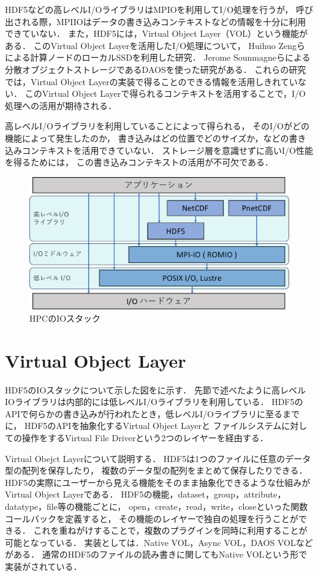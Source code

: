 \documentclass[submit,techrep,noauthor]{ipsj}
\begin{document}
HDF5などの高レベルI/OライブラリはMPIOを利用してI/O処理を行うが，
呼び出される際，MPIIOはデータの書き込みコンテキストなどの情報を十分に利用できていない．
また，HDF5には，Virtual Object Layer（VOL）という機能がある．
このVirtual Object Layerを活用したI/O処理について，
Huihuo Zengらによる計算ノードのローカルSSDを利用した研究\cite{zheng2022hdf5}．
Jerome Sounmagneらによる分散オブジェクトストレージであるDAOSを使った研究がある\cite{soumagne2021accelerating}．
これらの研究では，Virtual Object Layerの実装で得ることのできる情報を活用しきれていない．
このVirtual Object Layerで得られるコンテキストを活用することで，I/O処理への活用が期待される．

高レベルI/Oライブラリを利用していることによって得られる，
そのI/Oがどの機能によって発生したのか，
書き込みはどの位置でどのサイズか，などの書き込みコンテキストを活用できていない．
ストレージ層を意識せずに高いI/O性能を得るためには，
この書き込みコンテキストの活用が不可欠である．


\begin{figure}[tbp]
	\centering
	\includegraphics[page=1,width=\linewidth]{figure-crop.pdf}
	\caption{HPCのIOスタック}
	\label{fig:iotstack}
\end{figure}

\section{Virtual Object Layer}
HDF5のIOスタックについて示した図をに示す．
先節で述べたように高レベルIOライブラリは内部的には低レベルI/Oライブラリを利用している．
HDF5のAPIで何らかの書き込みが行われたとき，低レベルI/Oライブラリに至るまでに，
HDF5のAPIを抽象化するVirtual Object Layerと
ファイルシステムに対しての操作をするVirtual File Driverという2つのレイヤーを経由する．

Virtual Obejct Layerについて説明する．
HDF5は1つのファイルに任意のデータ型の配列を保存したり，
複数のデータ型の配列をまとめて保存したりできる．
HDF5の実際にユーザーから見える機能をそのまま抽象化できるような仕組みがVirtual Object Layerである．
HDF5の機能，dataset，group，attribute，datatype，file等の機能ごとに，
open，create，read，write，closeといった関数コールバックを定義すると，
その機能のレイヤーで独自の処理を行うことができる．
これを重ねがけすることで，複数のプラグインを同時に利用することが可能となっている．
実装としては．Native VOL，Async VOL，DAOS VOLなどがある．
通常のHDF5のファイルの読み書きに関してもNative VOLという形で実装がされている．
\end{document}
